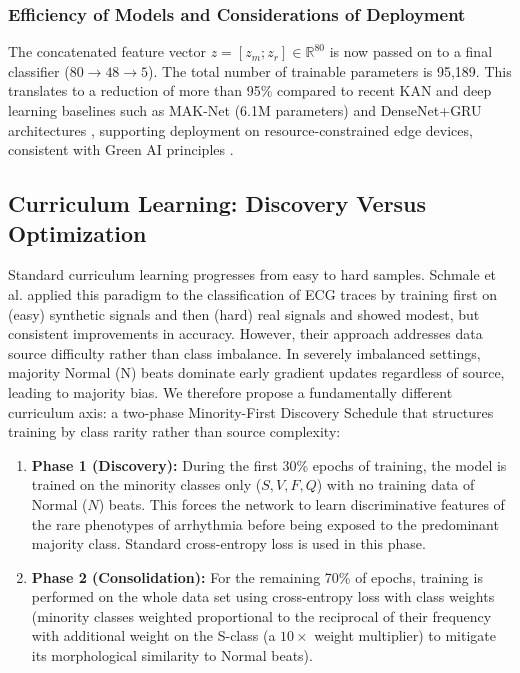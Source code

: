 \documentclass[journal,twoside,web]{ieeecolor}
\begin{document}
\subsubsection{Efficiency of Models and Considerations of Deployment}
The concatenated feature vector $z = [z_m; z_r] \in \mathbb{R}^{80}$ is now passed on to a final classifier ($80 \to 48 \to 5$). The total number of trainable parameters is 95,189. This translates to a reduction of more than 95\% compared to recent KAN and deep learning baselines such as MAK-Net (6.1M parameters) \cite{zhao_mak-net_2025} and DenseNet+GRU architectures \cite{guo_inter-patient_2019}, supporting deployment on resource-constrained edge devices, consistent with Green AI principles \cite{elsheikhy_lightweight_2025}.

\subsection{Curriculum Learning: Discovery Versus Optimization}
Standard curriculum learning progresses from easy to hard samples. Schmale et al. \cite{schmale_curriculum_2025} applied this paradigm to the classification of ECG traces by training first on (easy) synthetic signals and then (hard) real signals and showed modest, but consistent improvements in accuracy. However, their approach addresses data source difficulty rather than class imbalance. In severely imbalanced settings, majority Normal (N) beats dominate early gradient updates regardless of source, leading to majority bias. We therefore propose a fundamentally different curriculum axis: a two-phase Minority-First Discovery Schedule that structures training by class rarity rather than source complexity:

\begin{enumerate}
    \item \textbf{Phase 1 (Discovery):} During the first 30\% epochs of training, the model is trained on the minority classes only ($S, V, F, Q$) with no training data of Normal ($N$) beats. This forces the network to learn discriminative features of the rare phenotypes of arrhythmia before being exposed to the predominant majority class. Standard cross-entropy loss is used in this phase.
    
    \item \textbf{Phase 2 (Consolidation):} For the remaining 70\% of epochs, training is performed on the whole data set using cross-entropy loss with class weights (minority classes weighted proportional to the reciprocal of their frequency with additional weight on the S-class (a $10\times$ weight multiplier) to mitigate its morphological similarity to Normal beats).
\end{enumerate}
\end{document}
